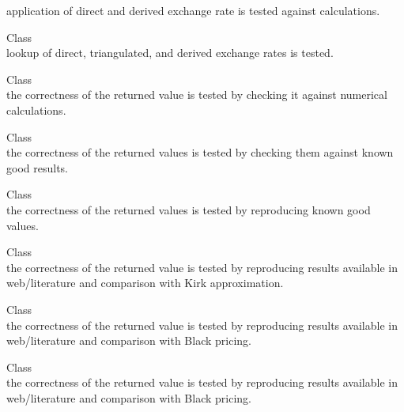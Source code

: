 \begin{DoxyRefList}
application of direct and derived exchange rate is tested against calculations.  
\item[Class \doxylink{class_quant_lib_1_1_exchange_rate_manager}{Quant\+Lib\+::Exchange\+Rate\+Manager} ]\hfill \\
\label{test__test000002}%
%
lookup of direct, triangulated, and derived exchange rates is tested.  
\item[Class \doxylink{class_quant_lib_1_1_factorial}{Quant\+Lib\+::Factorial} ]\hfill \\
\label{test__test000039}%
%
the correctness of the returned value is tested by checking it against numerical calculations.  
\item[Class \doxylink{class_quant_lib_1_1_false_position}{Quant\+Lib\+::False\+Position} ]\hfill \\
\label{test__test000069}%
%
the correctness of the returned values is tested by checking them against known good results. 
\item[Class \doxylink{class_quant_lib_1_1_faure_rsg}{Quant\+Lib\+::Faure\+Rsg} ]\hfill \\
\label{test__test000057}%
%
the correctness of the returned values is tested by reproducing known good values.  
\item[Class \doxylink{class_quant_lib_1_1_fd2d_black_scholes_vanilla_engine}{Quant\+Lib\+::Fd2d\+Black\+Scholes\+Vanilla\+Engine} ]\hfill \\
\label{test__test000112}%
%
the correctness of the returned value is tested by reproducing results available in web/literature and comparison with Kirk approximation.  
\item[Class \doxylink{class_quant_lib_1_1_fd_black_scholes_barrier_engine}{Quant\+Lib\+::Fd\+Black\+Scholes\+Barrier\+Engine} ]\hfill \\
\label{test__test000107}%
%
the correctness of the returned value is tested by reproducing results available in web/literature and comparison with Black pricing.  
\item[Class \doxylink{class_quant_lib_1_1_fd_black_scholes_vanilla_engine}{Quant\+Lib\+::Fd\+Black\+Scholes\+Vanilla\+Engine} ]\hfill \\
\label{test__test000150}%
%
the correctness of the returned value is tested by reproducing results available in web/literature and comparison with Black pricing.  

\end{DoxyRefList}
